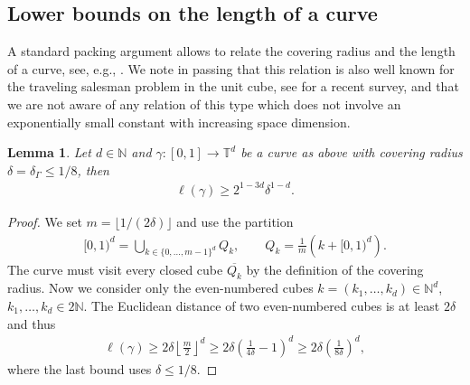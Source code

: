 \documentclass[11pt,a4paper,twoside,final,biblatex]{scrartcl}
\newcommand{\N}{\ensuremath{\mathbb{N}}}
\newcommand{\T}{\ensuremath{\mathbb{T}}}
\newtheorem{lemma}[theorem]{Lemma}
\theoremstyle{definition}
\numberwithin{equation}{section}
\numberwithin{table}{section}
\numberwithin{figure}{section}
\begin{document}
\subsection{Lower bounds on the length of a curve}\label{sec:length}

A standard packing argument allows to relate the covering radius and the length of a curve, see, e.g., \cite[last part of the proof of Thm.~2.2]{EhGr23}. We note in passing that this relation is also well known for the traveling salesman problem in the unit cube, see \cite{BaClDu24} for a recent survey, and that we are not aware of any relation of this type which does not involve an exponentially small constant with increasing space dimension.

\begin{lemma}\label{lem:deltaL}
 Let $d\in\N$ and $\gamma\colon[0,1]\to\T^d$ be a curve as above with covering radius $\delta=\delta_{\Gamma}\le 1/8$, then
 \begin{align*}
    \ell(\gamma)\ge 2^{1-3d} \delta^{1-d}.
 \end{align*}
\end{lemma}
\begin{proof}
 We set $m=\lfloor{1/(2\delta)}\rfloor$ and use the partition
 \begin{align*}
  [0,1)^d=\bigcup_{k\in\{0,\hdots,m-1\}^d} Q_k,\qquad Q_k=\frac1m \left(k + [0,1)^d\right).
 \end{align*}
 The curve must visit every closed cube $\overline{Q_k}$ by the definition of the covering radius. Now we consider only the even-numbered cubes $k=(k_1,\hdots,k_d)\in\N^d$, $k_1,\hdots,k_d\in2\N$. The Euclidean distance of two even-numbered cubes is at least $2\delta$ and thus
 \begin{align*}
  \ell(\gamma)
  \ge 2\delta\left\lfloor{\frac{m}{2}}\right\rfloor^d
  \ge 2\delta\left(\frac{1}{4\delta}-1\right)^d
  \ge 2\delta \left(\frac{1}{8\delta}\right)^d,
 \end{align*}
 where the last bound uses $\delta\le 1/8$.
\end{proof}
\end{document}
